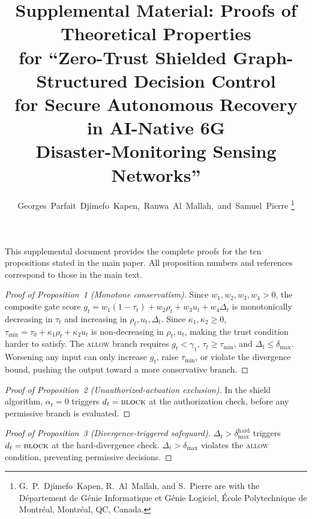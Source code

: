 \documentclass[lettersize,journal]{IEEEtran}
\begin{document}
\title{Supplemental Material: Proofs of Theoretical Properties\\
for ``Zero-Trust Shielded Graph-Structured Decision Control\\
for Secure Autonomous Recovery in AI-Native 6G\\
Disaster-Monitoring Sensing Networks''}

\author{Georges~Parfait~Djimefo~Kapen,~Ranwa~Al~Mallah,~and~Samuel~Pierre%
\thanks{G.~P.~Djimefo~Kapen, R.~Al~Mallah, and S.~Pierre are with the D\'{e}partement de G\'{e}nie Informatique et G\'{e}nie Logiciel, \'{E}cole Polytechnique de Montr\'{e}al, Montr\'{e}al, QC, Canada.}%
}

\maketitle

This supplemental document provides the complete proofs for the ten propositions stated in the main paper.
All proposition numbers and references correspond to those in the main text.

\bigskip

\begin{proof}[Proof of Proposition~1 (Monotone conservatism)]
Since $w_1, w_2, w_3, w_4 > 0$, the composite gate score $g_t = w_1(1-\tau_t)+w_2\rho_t+w_3 u_t+w_4\Delta_t$ is monotonically decreasing in $\tau_t$ and increasing in $\rho_t, u_t, \Delta_t$.
Since $\kappa_1, \kappa_2 \ge 0$, $\tau_{\min} = \tau_0 + \kappa_1\rho_t + \kappa_2 u_t$ is non-decreasing in $\rho_t, u_t$, making the trust condition harder to satisfy.
The \textsc{allow} branch requires $g_t < \gamma_1$, $\tau_t \ge \tau_{\min}$, and $\Delta_t \le \delta_{\max}$.
Worsening any input can only increase $g_t$, raise $\tau_{\min}$, or violate the divergence bound, pushing the output toward a more conservative branch.
\end{proof}

\begin{proof}[Proof of Proposition~2 (Unauthorized-actuation exclusion)]
In the shield algorithm, $\alpha_t=0$ triggers $d_t=\textsc{block}$ at the authorization check, before any permissive branch is evaluated.
\end{proof}

\begin{proof}[Proof of Proposition~3 (Divergence-triggered safeguard)]
$\Delta_t > \delta_{\max}^{\mathrm{hard}}$ triggers $d_t=\textsc{block}$ at the hard-divergence check.
$\Delta_t > \delta_{\max}$ violates the \textsc{allow} condition, preventing permissive decisions.
\end{proof}
\end{document}
